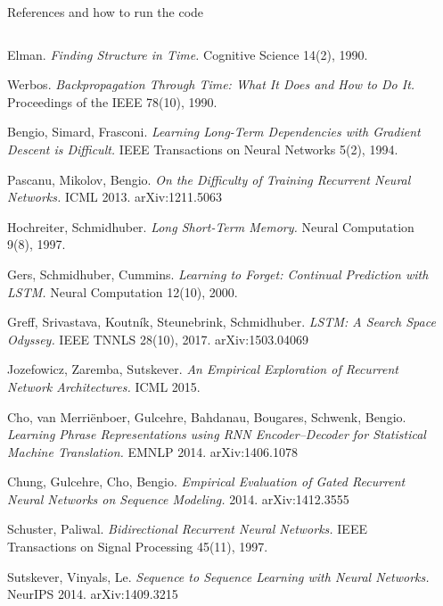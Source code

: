 \documentclass[aspectratio=169,10pt]{beamer}
\begin{document}
\begin{frame}{References and how to run the code}
\fontsize{6.4}{7.9}\selectfont
\begin{columns}[T,onlytextwidth]
\begin{enumerate}[{[1]}]\setlength{\itemsep}{0.6pt}
\item Elman. \emph{Finding Structure in Time.} Cognitive Science 14(2), 1990.
\item Werbos. \emph{Backpropagation Through Time: What It Does and How to Do It.} Proceedings of the IEEE 78(10), 1990.
\item Bengio, Simard, Frasconi. \emph{Learning Long-Term Dependencies with Gradient Descent is Difficult.} IEEE Transactions on Neural Networks 5(2), 1994.
\item Pascanu, Mikolov, Bengio. \emph{On the Difficulty of Training Recurrent Neural Networks.} ICML 2013. arXiv:1211.5063
\item Hochreiter, Schmidhuber. \emph{Long Short-Term Memory.} Neural Computation 9(8), 1997.
\item Gers, Schmidhuber, Cummins. \emph{Learning to Forget: Continual Prediction with LSTM.} Neural Computation 12(10), 2000.
\item Greff, Srivastava, Koutn\'ik, Steunebrink, Schmidhuber. \emph{LSTM: A Search Space Odyssey.} IEEE TNNLS 28(10), 2017. arXiv:1503.04069
\item Jozefowicz, Zaremba, Sutskever. \emph{An Empirical Exploration of Recurrent Network Architectures.} ICML 2015.
\item Cho, van Merri\"enboer, Gulcehre, Bahdanau, Bougares, Schwenk, Bengio. \emph{Learning Phrase Representations using RNN Encoder--Decoder for Statistical Machine Translation.} EMNLP 2014. arXiv:1406.1078
\item Chung, Gulcehre, Cho, Bengio. \emph{Empirical Evaluation of Gated Recurrent Neural Networks on Sequence Modeling.} 2014. arXiv:1412.3555
\item Schuster, Paliwal. \emph{Bidirectional Recurrent Neural Networks.} IEEE Transactions on Signal Processing 45(11), 1997.
\item Sutskever, Vinyals, Le. \emph{Sequence to Sequence Learning with Neural Networks.} NeurIPS 2014. arXiv:1409.3215
\end{enumerate}
\begin{enumerate}[{[1]}]\setlength{\itemsep}{0.6pt}
\setcounter{enumi}{12}

\end{enumerate}
\end{columns}
\end{frame}
\end{document}
